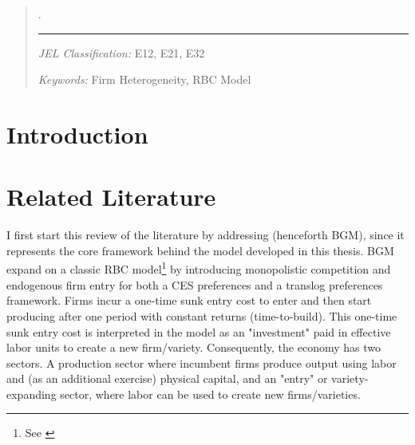 \documentclass[a4paper,12pt]{article} %
\numberwithin{equation}{section} %
\numberwithin{figure}{section}
\numberwithin{table}{section}
\begin{document}
\newpage
\begin{abstract} %

.

\begin{center}
\rule{10cm}{0.4pt}
\end{center}

\noindent
\textit{JEL Classification:} E12, E21, E32 %

\noindent
\textit{Keywords:} Firm Heterogeneity, RBC Model %
\end{abstract}

\newpage
{} %
\pagestyle{fancy}
\fancyhf{}
\fancyhead[C]{\leftmark}
\fancyfoot[C]{\thepage}

\thispagestyle{plain}
\section{Introduction}
\label{sec:introduction}


\section{Related Literature}
\label{sec:literature}



I first start this review of the literature by addressing \textcite{bilbiie2012endogenous} (henceforth BGM), since it represents the core framework behind the model developed in this thesis. BGM expand on a classic RBC model\footnote{See \textcite{king1999resuscitating}} by introducing monopolistic competition and endogenous firm entry for both a CES preferences and a translog preferences framework. Firms incur a one-time sunk entry cost to enter and then start producing after one period with constant returns (time-to-build). This one-time sunk entry cost is interpreted in the model as an "investment" paid in effective labor units to create a new firm/variety. Consequently, the economy has two sectors. A production sector where incumbent firms produce output using labor and (as an additional exercise) physical capital, and an "entry" or variety-expanding sector, where labor can be used to create new firms/varieties. 
\end{document}

